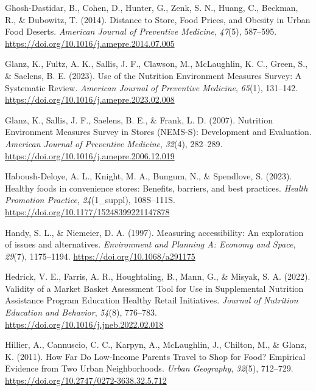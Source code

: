 \documentclass[
  letterpaper,
  number,
  review,
  3p]{elsarticle}
\newlength{\cslhangindent}
\newenvironment{CSLReferences}[2] %
 {\begin{list}{}{%
  \setlength{\itemindent}{0pt}
  \setlength{\leftmargin}{0pt}
  \setlength{\parsep}{0pt}
  \ifodd #1
   \setlength{\leftmargin}{\cslhangindent}
   \setlength{\itemindent}{-1\cslhangindent}
  \fi
  \setlength{\itemsep}{#2\baselineskip}}}
 {\end{list}}
\begin{document}
\begin{CSLReferences}{1}{0}
Ghosh-Dastidar, B., Cohen, D., Hunter, G., Zenk, S. N., Huang, C.,
Beckman, R., \& Dubowitz, T. (2014). Distance to {Store}, {Food Prices},
and {Obesity} in {Urban Food Deserts}. \emph{American Journal of
Preventive Medicine}, \emph{47}(5), 587--595.
\url{https://doi.org/10.1016/j.amepre.2014.07.005}

Glanz, K., Fultz, A. K., Sallis, J. F., Clawson, M., McLaughlin, K. C.,
Green, S., \& Saelens, B. E. (2023). Use of the {Nutrition Environment
Measures Survey}: {A Systematic Review}. \emph{American Journal of
Preventive Medicine}, \emph{65}(1), 131--142.
\url{https://doi.org/10.1016/j.amepre.2023.02.008}

Glanz, K., Sallis, J. F., Saelens, B. E., \& Frank, L. D. (2007).
Nutrition {Environment Measures Survey} in {Stores} ({NEMS-S}):
{Development} and {Evaluation}. \emph{American Journal of Preventive
Medicine}, \emph{32}(4), 282--289.
\url{https://doi.org/10.1016/j.amepre.2006.12.019}

Haboush-Deloye, A. L., Knight, M. A., Bungum, N., \& Spendlove, S.
(2023). Healthy foods in convenience stores: Benefits, barriers, and
best practices. \emph{Health Promotion Practice}, \emph{24}(1\_suppl),
108S--111S. \url{https://doi.org/10.1177/15248399221147878}

Handy, S. L., \& Niemeier, D. A. (1997). Measuring accessibility: {An}
exploration of issues and alternatives. \emph{Environment and Planning
A: Economy and Space}, \emph{29}(7), 1175--1194.
\url{https://doi.org/10.1068/a291175}

Hedrick, V. E., Farris, A. R., Houghtaling, B., Mann, G., \& Misyak, S.
A. (2022). Validity of a {Market Basket Assessment Tool} for {Use} in
{Supplemental Nutrition Assistance Program Education Healthy Retail
Initiatives}. \emph{Journal of Nutrition Education and Behavior},
\emph{54}(8), 776--783. \url{https://doi.org/10.1016/j.jneb.2022.02.018}

Hillier, A., Cannuscio, C. C., Karpyn, A., McLaughlin, J., Chilton, M.,
\& Glanz, K. (2011). How {Far Do Low-Income Parents Travel} to {Shop}
for {Food}? {Empirical Evidence} from {Two Urban Neighborhoods}.
\emph{Urban Geography}, \emph{32}(5), 712--729.
\url{https://doi.org/10.2747/0272-3638.32.5.712}


\end{CSLReferences}
\end{document}
